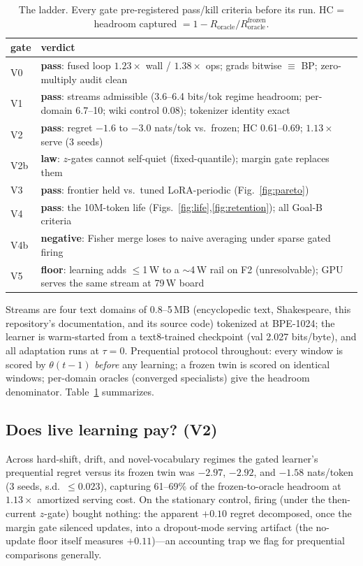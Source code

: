 \documentclass{article}
\begin{document}
\begin{table}[t]
\caption{The ladder. Every gate pre-registered pass/kill criteria before its
run. HC = headroom captured $=1-R_{\mathrm{oracle}}/R^{\mathrm{frozen}}_{\mathrm{oracle}}$.}
\label{tab:ladder}
\vskip 0.05in
\centering
\scriptsize
\begin{tabular}{@{}lp{5.35cm}@{}}
\toprule
gate & verdict \\
\midrule
V0 & \textbf{pass}: fused loop $1.23\times$ wall / $1.38\times$ ops; grads
bitwise $\equiv$ BP; zero-multiply audit clean \\
V1 & \textbf{pass}: streams admissible (3.6--6.4 bits/tok regime headroom;
per-domain 6.7--10; wiki control 0.08); tokenizer identity exact \\
V2 & \textbf{pass}: regret $-1.6$ to $-3.0$ nats/tok vs.\ frozen; HC
0.61--0.69; $1.13\times$ serve (3 seeds) \\
V2b & \textbf{law}: $z$-gates cannot self-quiet (fixed-quantile); margin gate
replaces them \\
V3 & \textbf{pass}: frontier held vs.\ tuned LoRA-periodic (Fig.~\ref{fig:pareto}) \\
V4 & \textbf{pass}: the 10M-token life (Figs.~\ref{fig:life},\ref{fig:retention});
all Goal-B criteria \\
V4b & \textbf{negative}: Fisher merge loses to naive averaging under sparse
gated firing \\
V5 & \textbf{floor}: learning adds $\le$1\,W to a $\sim$4\,W rail on F2
(unresolvable); GPU serves the same stream at 79\,W board \\
\bottomrule
\end{tabular}
\vskip -0.1in
\end{table}

Streams are four text domains of 0.8--5\,MB (encyclopedic text,
Shakespeare, this repository's documentation, and its source code)
tokenized at BPE-1024; the learner is
warm-started from a text8-trained checkpoint (val 2.027 bits/byte), and all
adaptation runs at $\tau{=}0$. Prequential protocol throughout: every window
is scored by $\theta(t{-}1)$ \emph{before} any learning; a frozen twin is
scored on identical windows; per-domain oracles (converged specialists) give
the headroom denominator. Table~\ref{tab:ladder} summarizes.

\subsection{Does live learning pay? (V2)}
Across hard-shift, drift, and novel-vocabulary regimes the gated learner's
prequential regret versus its frozen twin was $-2.97$, $-2.92$, and $-1.58$
nats/token (3 seeds, s.d.\ $\le 0.023$), capturing 61--69\% of the
frozen-to-oracle headroom at $1.13\times$ amortized serving cost. On the
stationary control, firing (under the then-current $z$-gate) bought nothing:
the apparent $+0.10$ regret decomposed, once the margin gate silenced
updates, into a dropout-mode serving artifact (the no-update floor itself measures $+0.11$)---an accounting trap we flag
for prequential comparisons generally.
\end{document}
